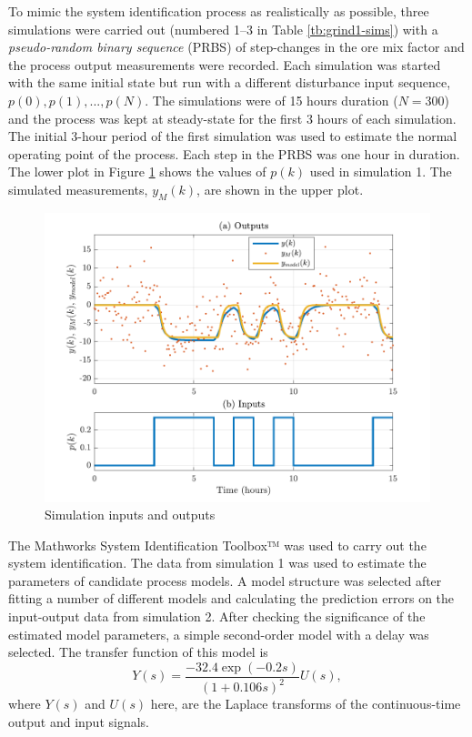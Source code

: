 To mimic the system identification process as realistically as possible, three simulations were carried out (numbered 1--3 in Table \ref{tb:grind1-sims}) with a \textit{pseudo-random binary sequence} (\gls{PRBS}) of step-changes in the ore mix factor and the process output measurements were recorded. Each simulation was started with the same initial state but run with a different disturbance input sequence, $p(0), p(1), ..., p(N)$. The simulations were of 15 hours duration ($N=300$) and the process was kept at steady-state for the first 3 hours of each simulation. The initial 3-hour period of the first simulation was used to estimate the normal operating point of the process. Each step in the \gls{PRBS} was one hour in duration. The lower plot in Figure \ref{fig:grind1-sim_ioplots} shows the values of $p(k)$ used in simulation 1. The simulated measurements, $y_M(k)$, are shown in the upper plot.
\begin{figure}[htp]
	\centering
	\includegraphics[width=13cm]{images/grind1_rod_obs_sim_1_ioplot_P2DcTd4.pdf}
	\caption{Simulation inputs and outputs}
	\label{fig:grind1-sim_ioplots}
\end{figure}

The Mathworks System Identification Toolbox™ was used to carry out the system identification. The data from simulation 1 was used to estimate the parameters of candidate process models. A model structure was selected after fitting a number of different models and calculating the prediction errors on the input-output data from simulation 2. After checking the significance of the estimated model parameters, a simple second-order model with a delay was selected. The transfer function of this model is
\begin{equation} \label{eq:grind1-id-model-ctf}
	Y(s)= \frac{-32.4\exp(-0.2s)}{(1 + 0.106s)^2}U(s),
\end{equation}
%
%
%
where $Y(s)$ and $U(s)$ here, are the Laplace transforms of the continuous-time output and input signals.


